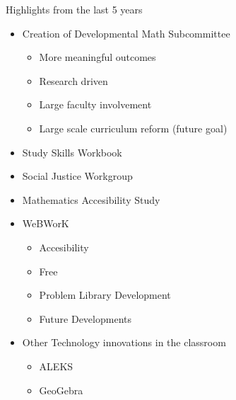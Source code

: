 \documentclass{beamer}
\begin{document}
\begin{frame}{Highlights from the last 5 years}

\begin{itemize}

\pause \item Creation of Developmental Math Subcommittee
	\begin{itemize}
	\pause\item More meaningful outcomes
	\pause\item Research driven
	\pause\item Large faculty involvement
	\pause \item Large scale curriculum reform (future goal)
	\end{itemize}

\pause \item Study Skills Workbook
\pause \item Social Justice Workgroup
\pause \item Mathematics Accesibility Study
\pause \item WeBWorK
	\begin{itemize}
	\pause \item Accesibility
	\pause \item Free
	\pause \item Problem Library Development
	\pause \item Future Developments
	\end{itemize}

\pause \item Other Technology innovations in the classroom
	\begin{itemize}
	\pause \item ALEKS
	\pause \item GeoGebra
	\end{itemize}

\end{itemize}
\end{frame}
\end{document}
